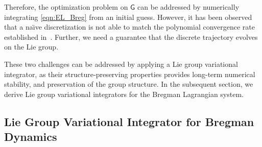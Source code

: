 \documentclass[letterpaper, 10pt, conference]{ieeeconf}
\newcommand{\G}{\ensuremath{\mathsf{G}}}
\begin{document}
Therefore, the optimization problem on $\G$ can be addressed by numerically integrating \eqref{eqn:EL_Breg} from an initial guess. 
However, it has been observed that a na\"\i ve discretization is not able to match the polynomial convergence rate established in~\cite{wibisono2016variational}.
Further, we need a guarantee that the discrete trajectory evolves on the Lie group.

These two challenges can be addressed by applying a Lie group variational integrator, 
as their structure-preserving properties provides long-term numerical stability, and preservation of the group structure.
In the subsequent section, we derive Lie group variational integrators for the Bregman Lagrangian system. 

\subsection{Lie Group Variational Integrator for Bregman Dynamics}
\end{document}
